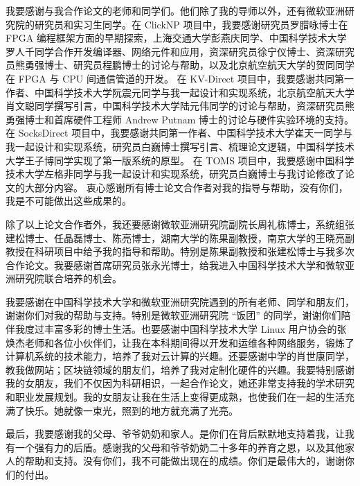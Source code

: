\begin{acknowledgements}
我要感谢与我合作论文的老师和同学们。他们除了我的导师以外，还有微软亚洲研究院的研究员和实习生同学。在 ClickNP 项目中，我要感谢研究员罗腊咏博士在 FPGA 编程框架方面的早期探索，上海交通大学彭燕庆同学、中国科学技术大学罗人千同学合作开发编译器、网络元件和应用，资深研究员徐宁仪博士、资深研究员熊勇强博士、研究员程鹏博士的讨论与帮助，以及北京航空航天大学的贺同同学在 FPGA 与 CPU 间通信管道的开发。
在 KV-Direct 项目中，我要感谢共同第一作者、中国科学技术大学阮震元同学与我一起设计和实现系统，北京航空航天大学肖文聪同学撰写引言，中国科学技术大学陆元伟同学的讨论与帮助，资深研究员熊勇强博士和首席硬件工程师 Andrew Putnam 博士的讨论与硬件实验环境的支持。
在 SocksDirect 项目中，我要感谢共同第一作者、中国科学技术大学崔天一同学与我一起设计和实现系统，研究员白巍博士撰写引言、梳理论文逻辑，中国科学技术大学王子博同学实现了第一版系统的原型。
在 TOMS 项目中，我要感谢中国科学技术大学左格非同学与我一起设计和实现系统，研究员白巍博士与我讨论修改了论文的大部分内容。
衷心感谢所有博士论文合作者对我的指导与帮助，没有你们，我是不可能做出这些成果的。

除了以上论文合作者外，我还要感谢微软亚洲研究院副院长周礼栋博士，系统组张建松博士、任晶磊博士、陈亮博士，湖南⼤学的陈果副教授，南京⼤学的王晓亮副教授在科研项⽬中给予我的指导和帮助。特别是陈果副教授和张建松博士与我多次合作论文。我要感谢首席研究员张永光博士，给我进入中国科学技术⼤学和微软亚洲研究院联合培养的机会。

我要感谢在中国科学技术⼤学和微软亚洲研究院遇到的所有⽼师、同学和朋友们，谢谢你们对我的帮助与支持。特别是微软亚洲研究院 ``饭团'' 的同学，谢谢你们陪伴我度过丰富多彩的博士生活。也要感谢中国科学技术大学 Linux 用户协会的张焕杰老师和各位小伙伴们，让我在本科期间得以开发和运维各种网络服务，锻炼了计算机系统的技术能力，培养了我对云计算的兴趣。还要感谢中学的肖世康同学，教我做网站；区块链领域的朋友们，培养了我对定制化硬件的兴趣。我要特别感谢我的女朋友，我们不仅因为科研相识，一起合作论文，她还非常支持我的学术研究和职业发展规划。我的女朋友让我在生活上变得更成熟，也使我们在一起的生活充满了快乐。她就像一束光，照到的地方就充满了光亮。

最后，我要感谢我的⽗母、爷爷奶奶和家⼈。是你们在背后默默地⽀持着我，让我有⼀个强有⼒的后盾。感谢我的⽗母和爷爷奶奶⼆⼗多年的养育之恩，以及其他家⼈的帮助和⽀持。没有你们，我不可能做出现在的成绩。你们是最伟⼤的，谢谢你们的付出。
\end{acknowledgements}
